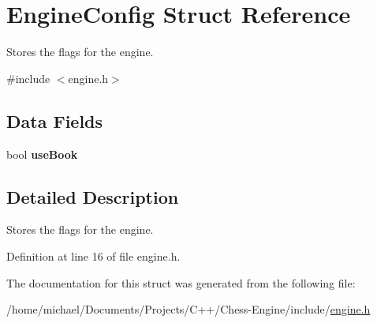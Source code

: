 \hypertarget{structEngineConfig}{}\section{Engine\+Config Struct Reference}
\label{structEngineConfig}


Stores the flags for the engine.  




{\ttfamily \#include $<$engine.\+h$>$}

\subsection*{Data Fields}
\begin{DoxyCompactItemize}
\item 
\mbox{\label{structEngineConfig_a6f6849a5e9919e75b34cd44b8a25a7bf}} 
bool {\bfseries use\+Book}
\end{DoxyCompactItemize}


\subsection{Detailed Description}
Stores the flags for the engine. 

Definition at line 16 of file engine.\+h.



The documentation for this struct was generated from the following file\+:\begin{DoxyCompactItemize}
\item 
/home/michael/\+Documents/\+Projects/\+C++/\+Chess-\/\+Engine/include/\mbox{\hyperlink{engine_8h}{engine.\+h}}\end{DoxyCompactItemize}
